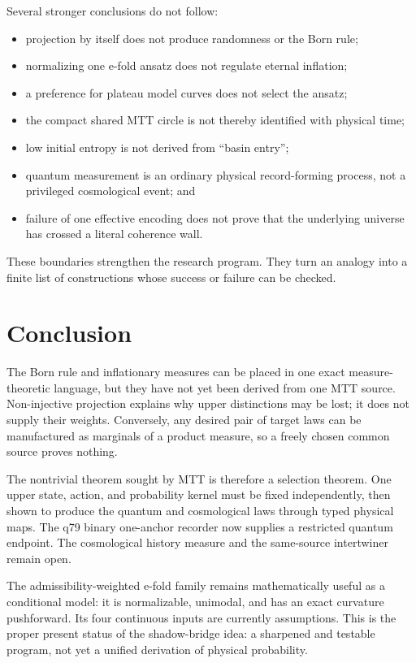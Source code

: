 \documentclass[11pt]{article}
\begin{document}
Several stronger conclusions do not follow:
\begin{itemize}
\item projection by itself does not produce randomness or the Born rule;
\item normalizing one e-fold ansatz does not regulate eternal inflation;
\item a preference for plateau model curves does not select the ansatz;
\item the compact shared MTT circle is not thereby identified with physical
time;
\item low initial entropy is not derived from ``basin entry'';
\item quantum measurement is an ordinary physical record-forming process, not
a privileged cosmological event; and
\item failure of one effective encoding does not prove that the underlying
universe has crossed a literal coherence wall.
\end{itemize}

These boundaries strengthen the research program. They turn an analogy into a
finite list of constructions whose success or failure can be checked.

\section{Conclusion}

The Born rule and inflationary measures can be placed in one exact
measure-theoretic language, but they have not yet been derived from one MTT
source. Non-injective projection explains why upper distinctions may be lost;
it does not supply their weights. Conversely, any desired pair of target laws
can be manufactured as marginals of a product measure, so a freely chosen
common source proves nothing.

The nontrivial theorem sought by MTT is therefore a selection theorem. One
upper state, action, and probability kernel must be fixed independently, then
shown to produce the quantum and cosmological laws through typed physical maps.
The q79 binary one-anchor recorder now supplies a restricted quantum endpoint.
The cosmological history measure and the same-source intertwiner remain open.

The admissibility-weighted e-fold family remains mathematically useful as a
conditional model: it is normalizable, unimodal, and has an exact curvature
pushforward. Its four continuous inputs are currently assumptions. This is the
proper present status of the shadow-bridge idea: a sharpened and testable
program, not yet a unified derivation of physical probability.
\end{document}
